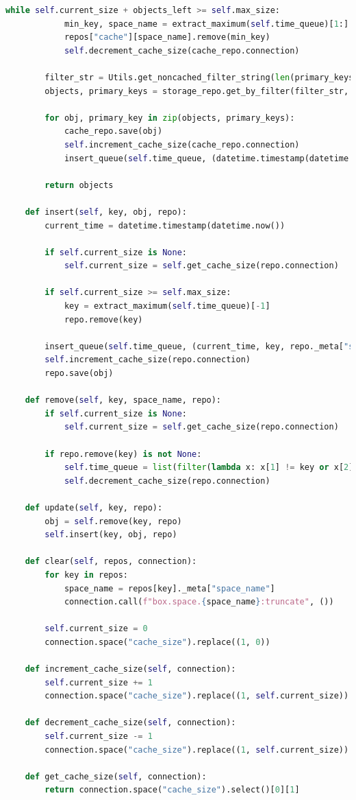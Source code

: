 \begin{lstlisting}[label=lst:cache, caption=Листинг модуля кэширования данных с политикой вытеснения LRU, language=python]
		while self.current_size + objects_left >= self.max_size:
			min_key, space_name = extract_maximum(self.time_queue)[1:]
			repos["cache"][space_name].remove(min_key)
			self.decrement_cache_size(cache_repo.connection)
		
		filter_str = Utils.get_noncached_filter_string(len(primary_keys), index)
		objects, primary_keys = storage_repo.get_by_filter(filter_str, tuple(map(int, [key] + primary_keys)))
		
		for obj, primary_key in zip(objects, primary_keys):
			cache_repo.save(obj)
			self.increment_cache_size(cache_repo.connection)
			insert_queue(self.time_queue, (datetime.timestamp(datetime.now()), primary_key, space_name))
		
		return objects
	
	def insert(self, key, obj, repo):
		current_time = datetime.timestamp(datetime.now())
	
		if self.current_size is None:
			self.current_size = self.get_cache_size(repo.connection)
	
		if self.current_size >= self.max_size:
			key = extract_maximum(self.time_queue)[-1]
			repo.remove(key)
	
		insert_queue(self.time_queue, (current_time, key, repo._meta["space_name"]))
		self.increment_cache_size(repo.connection)
		repo.save(obj)
	
	def remove(self, key, space_name, repo):
		if self.current_size is None:
			self.current_size = self.get_cache_size(repo.connection)
	
		if repo.remove(key) is not None:
			self.time_queue = list(filter(lambda x: x[1] != key or x[2] != space_name, self.time_queue))
			self.decrement_cache_size(repo.connection)
	
	def update(self, key, repo):
		obj = self.remove(key, repo)
		self.insert(key, obj, repo)
	
	def clear(self, repos, connection):
		for key in repos:
			space_name = repos[key]._meta["space_name"]
			connection.call(f"box.space.{space_name}:truncate", ())
	
		self.current_size = 0
		connection.space("cache_size").replace((1, 0))
	
	def increment_cache_size(self, connection):
		self.current_size += 1
		connection.space("cache_size").replace((1, self.current_size))
	
	def decrement_cache_size(self, connection):
		self.current_size -= 1
		connection.space("cache_size").replace((1, self.current_size))
	
	def get_cache_size(self, connection):
		return connection.space("cache_size").select()[0][1]
\end{lstlisting}

